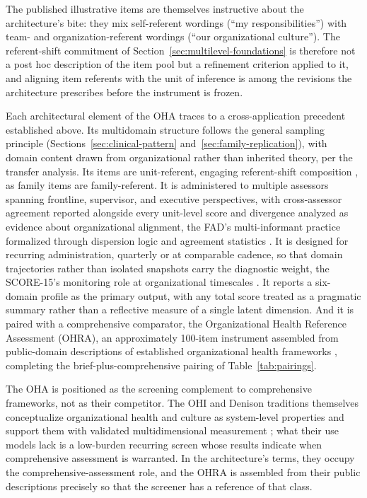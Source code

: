 \documentclass[12pt, letterpaper]{article}
\begin{document}
The published illustrative items are themselves instructive about the architecture's bite: they mix self-referent wordings (``my responsibilities'') with team- and organization-referent wordings (``our organizational culture''). The referent-shift commitment of Section~\ref{sec:multilevel-foundations} is therefore not a post hoc description of the item pool but a refinement criterion applied to it, and aligning item referents with the unit of inference is among the revisions the architecture prescribes before the instrument is frozen.

Each architectural element of the OHA traces to a cross-application precedent established above. Its multidomain structure follows the general sampling principle (Sections~\ref{sec:clinical-pattern} and~\ref{sec:family-replication}), with domain content drawn from organizational rather than inherited theory, per the transfer analysis. Its items are unit-referent, engaging referent-shift composition \parencite{chan1998}, as family items are family-referent. It is administered to multiple assessors spanning frontline, supervisor, and executive perspectives, with cross-assessor agreement reported alongside every unit-level score and divergence analyzed as evidence about organizational alignment, the FAD's multi-informant practice formalized through dispersion logic and agreement statistics \parencite{miller2000,chan1998,james1984,lebreton2008}. It is designed for recurring administration, quarterly or at comparable cadence, so that domain trajectories rather than isolated snapshots carry the diagnostic weight, the SCORE-15's monitoring role at organizational timescales \parencite{stratton2014}. It reports a six-domain profile as the primary output, with any total score treated as a pragmatic summary rather than a reflective measure of a single latent dimension. And it is paired with a comprehensive comparator, the Organizational Health Reference Assessment (OHRA), an approximately 100-item instrument assembled from public-domain descriptions of established organizational health frameworks \parencite{camp2024,denison1990,denison1995}, completing the brief-plus-comprehensive pairing of Table~\ref{tab:pairings}.

The OHA is positioned as the screening complement to comprehensive frameworks, not as their competitor. The OHI and Denison traditions themselves conceptualize organizational health and culture as system-level properties and support them with validated multidimensional measurement \parencite{camp2024,denison1990,denison1995}; what their use models lack is a low-burden recurring screen whose results indicate when comprehensive assessment is warranted. In the architecture's terms, they occupy the comprehensive-assessment role, and the OHRA is assembled from their public descriptions precisely so that the screener has a reference of that class.
\end{document}
